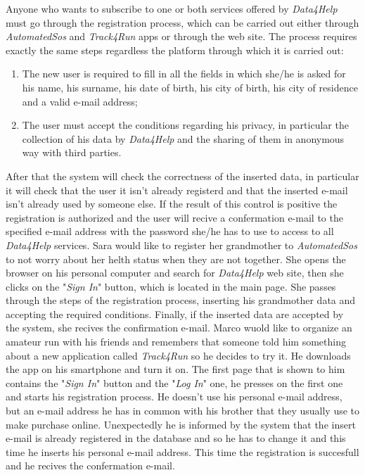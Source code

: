 Anyone who wants to subscribe to one or both services offered by \textit{Data4Help} must go through the registration process, which can be carried out either through \textit{AutomatedSos} and \textit{Track4Run} apps or through the web site.
The process requires exactly the same steps regardless the platform through which it is carried out:
\begin{enumerate}
  \item The new user is required to fill in all the fields in which she/he is asked for his name, his surname, his date of birth, his city of birth, his city of residence and a valid e-mail address;
  \item The user must accept the conditions regarding his privacy, in particular the collection of his data by \textit{Data4Help} and the sharing of them in anonymous way with third parties.
\end{enumerate}
After that the system will check the correctness of the inserted data, in particular it will check that the user it isn't already registerd and that the inserted e-mail isn't already used by someone else. If the result of this control is positive the registration is authorized and the user will recive a confermation e-mail to the specified e-mail address with the password she/he has to use to access to all \textit{Data4Help} services.
Sara would like to register her grandmother to \textit{AutomatedSos} to not worry about her helth status when they are not together. She opens the browser on his personal computer and search for \textit{Data4Help} web site, then she clicks on the "\textit{Sign In}" button, which is located in the main page. She passes through the steps of the registration process, inserting his grandmother data and accepting the required conditions. Finally, if the inserted data are accepted by the system, she recives the confirmation e-mail.
Marco wuold like to organize an amateur run with his friends and remembers that someone told him something about a new application called \textit{Track4Run} so he decides to try it. He downloads the app on his smartphone and turn it on. The first page that is shown to him contains the "\textit{Sign In}" button and the "\textit{Log In}" one, he presses on the first one and starts his registration process. He doesn't use his personal e-mail address, but an e-mail address he has in common with his brother that they usually use to make purchase online. Unexpectedly he is informed by the system that the insert e-mail is already registered in the database and so he has to change it and this time he inserts his personal e-mail address. This time the registration is succesfull and he recives the confermation e-mail.
